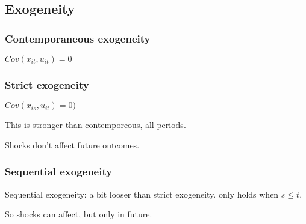 
\subsection{Exogeneity}

\subsubsection{Contemporaneous exogeneity}

\(Cov(x_{it},u_{it})=0\)

\subsubsection{Strict exogeneity}

\(Cov (x_{is}, u_{it})=0)\)

This is stronger than contemporeous, all periods.

Shocks don't affect future outcomes.

\subsubsection{Sequential exogeneity}

Sequential exogeneity: a bit looser than strict exogeneity. only holds when \(s\le t\).

So shocks can affect, but only in future.

